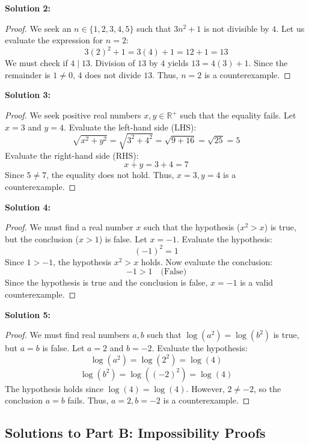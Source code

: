 \documentclass[11pt]{article}
\theoremstyle{definition}
\begin{document}
\textbf{Solution 2:}
\begin{proof}
We seek an $n \in \{1, 2, 3, 4, 5\}$ such that $3n^2 + 1$ is not divisible by $4$. Let us evaluate the expression for $n = 2$:
\[ 3(2)^2 + 1 = 3(4) + 1 = 12 + 1 = 13 \]
We must check if $4 \mid 13$. Division of $13$ by $4$ yields $13 = 4(3) + 1$. Since the remainder is $1 \neq 0$, $4$ does not divide $13$. Thus, $n = 2$ is a counterexample.
\end{proof}

\textbf{Solution 3:}
\begin{proof}
We seek positive real numbers $x, y \in \mathbb{R}^+$ such that the equality fails. Let $x = 3$ and $y = 4$. Evaluate the left-hand side (LHS):
\[ \sqrt{x^2 + y^2} = \sqrt{3^2 + 4^2} = \sqrt{9 + 16} = \sqrt{25} = 5 \]
Evaluate the right-hand side (RHS):
\[ x + y = 3 + 4 = 7 \]
Since $5 \neq 7$, the equality does not hold. Thus, $x = 3, y = 4$ is a counterexample.
\end{proof}

\textbf{Solution 4:}
\begin{proof}
We must find a real number $x$ such that the hypothesis ($x^2 > x$) is true, but the conclusion ($x > 1$) is false. Let $x = -1$. Evaluate the hypothesis:
\[ (-1)^2 = 1 \]
Since $1 > -1$, the hypothesis $x^2 > x$ holds. Now evaluate the conclusion:
\[ -1 > 1 \quad \text{(False)} \]
Since the hypothesis is true and the conclusion is false, $x = -1$ is a valid counterexample.
\end{proof}

\textbf{Solution 5:}
\begin{proof}
We must find real numbers $a, b$ such that $\log(a^2) = \log(b^2)$ is true, but $a = b$ is false. Let $a = 2$ and $b = -2$. Evaluate the hypothesis:
\[ \log(a^2) = \log(2^2) = \log(4) \]
\[ \log(b^2) = \log((-2)^2) = \log(4) \]
The hypothesis holds since $\log(4) = \log(4)$. However, $2 \neq -2$, so the conclusion $a = b$ fails. Thus, $a = 2, b = -2$ is a counterexample.
\end{proof}

\subsection*{Solutions to Part B: Impossibility Proofs}
\end{document}
